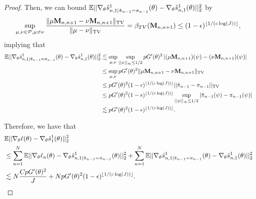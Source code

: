 \begin{proof}
Then, we can bound 
$\mathbb{E}||\nabla_\theta\hat s_{n,1|\hat\pi_{n-1}=\pi_{n-1}}^1(\theta) - \nabla_\theta\hat s_{n,1}^1(\theta)||_2^2$ by
$$\sup _{\mu, \nu \in \mathcal{P}, \mu \neq \nu} \frac{\|\mu \textbf{M}_{n,n+1}-\nu \textbf{M}_{n,n+1}\|_{\mathrm{TV}}}{\|\mu-\nu\|_{\mathrm{TV}}} = \beta_{TV}(\textbf{M}_{n,n+1}) \leq (1-\epsilon)^{\lfloor 1/(c\log(J)) \rfloor},$$
implying that
\begin{align}
    \mathbb{E}||\nabla_\theta\hat s_{n,1|\hat\pi_{n-1}=\pi_{n-1}}^1(\theta) - \nabla_\theta\hat s_{n,1}^1(\theta)||_2^2 
    &\lesssim \sup_{\mu, \nu} \sup_{||\psi||_\infty \leq 1/2} pG'(\theta)^2\left|(\mu \textbf{M}_{n,n+1})(\psi)-(\nu \textbf{M}_{n,n+1})(\psi)\right| \\
    &\leq \sup_{\mu, \nu} pG'(\theta)^2\|\mu \textbf{M}_{n,n+1}-\nu \textbf{M}_{n,n+1}\|_{\mathrm{TV}} \\
    &\leq pG'(\theta)^2(1-\epsilon)^{\lfloor 1/(c\log(J)) \rfloor} ||\hat\pi_{n-1} - \pi_{n-1}||_{\text{TV}} \\
    &\leq pG'(\theta)^2(1-\epsilon)^{\lfloor 1/(c\log(J)) \rfloor} \sup_{||\psi||_{\infty} \leq 1/2} |\hat\pi_{n-1}(\psi) - \pi_{n-1}(\psi)| \\
    &\lesssim pG'(\theta)^2(1-\epsilon)^{\lfloor 1/(c\log(J)) \rfloor}.
\end{align}

Therefore, we have that
\begin{align}
    &\mathbb{E}||\nabla_\theta\ell(\theta) - \nabla_\theta\hat s_1^1(\theta)||_2^2 \\
    &\leq \sum_{n=1}^N \mathbb{E}||\nabla_\theta\ell_n(\theta) - \nabla_\theta\hat s_{n,1|\hat\pi_{n-1}=\pi_{n-1}}^1(\theta)||_2^2 + \sum_{n=1}^N \mathbb{E}||\nabla_\theta\hat s_{n,1|\hat\pi_{n-1}=\pi_{n-1}}^1(\theta) - \nabla_\theta\hat s_{n,1}^1(\theta)||_2^2\\
    &\lesssim N\frac{CpG'(\theta)^2}{J} + NpG'(\theta)^2(1-\epsilon)^{\lfloor 1/(c\log(J)) \rfloor}.
\end{align}
\end{proof}
